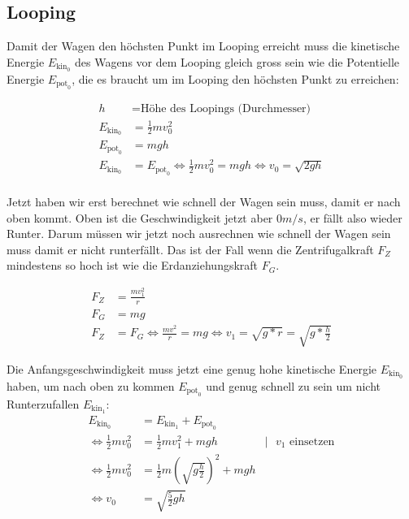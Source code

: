 \subsection{Looping}
Damit der Wagen den höchsten Punkt im Looping erreicht muss die kinetische Energie $E_{\text{kin}_0}$ des Wagens vor dem Looping gleich gross sein wie die Potentielle Energie $E_{\text{pot}_0}$, die es braucht um im Looping den höchsten Punkt zu erreichen:


\begin{equation*}
\begin{aligned}
h &= \text{Höhe des Loopings (Durchmesser)} \\
E_{\text{kin}_0} &= \frac{1}{2}  m v_0^2 \\
E_{\text{pot}_0} &= mgh \\
E_{\text{kin}_0} &= E_{\text{pot}_0} 
\Leftrightarrow \frac{1}{2}  m v_0^2 = mgh 
\Leftrightarrow v_0 = \sqrt{2gh} \\
\end{aligned}
\end{equation*}

Jetzt haben wir erst berechnet wie schnell der Wagen sein muss, damit er nach oben kommt. Oben ist die Geschwindigkeit jetzt aber $0 m/s$, er fällt also wieder Runter. Darum müssen wir jetzt noch ausrechnen wie schnell der Wagen sein muss damit er nicht runterfällt. Das ist der Fall wenn die Zentrifugalkraft $F_Z$ mindestens so hoch ist wie die Erdanziehungskraft $F_G$.


\begin{equation*}
\begin{aligned}
F_Z &= \frac{mv_1^2}{r} \\
F_G &= mg \\
F_Z &= F_G 
\Leftrightarrow \frac{mv^2}{r} = mg 
\Leftrightarrow v_1 = \sqrt{g * r} = \sqrt{g * \frac{h}{2}}
\end{aligned}
\end{equation*}

Die Anfangsgeschwindigkeit muss jetzt eine genug hohe kinetische Energie $E_{\text{kin}_0}$ haben, um nach oben zu kommen $E_{\text{pot}_0}$ und genug schnell zu sein um nicht Runterzufallen $E_{\text{kin}_1}$:
\begin{equation*}
\begin{aligned}
E_{\text{kin}_0} &= E_{\text{kin}_1} + E_{\text{pot}_0} \\
\Leftrightarrow \frac{1}{2} m v_0^2 &= \frac{1}{2} m v_1^2 + mgh &| \text{ $v_1$ einsetzen} \\
\Leftrightarrow \frac{1}{2} m v_0^2 &= \frac{1}{2} m (\sqrt{g\frac{h}{2}})^2 + mgh \\
\Leftrightarrow v_0 &= \sqrt{\frac{5}{2}gh}
\end{aligned}
\end{equation*}

